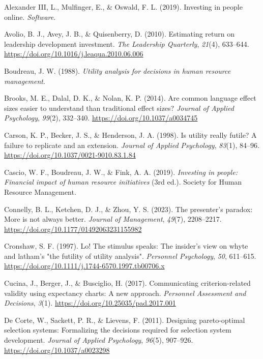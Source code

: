 \documentclass[
  english,
  man]{apa6}
\newlength{\cslhangindent}
\newenvironment{CSLReferences}[2] %
 {\begin{list}{}{%
  \setlength{\itemindent}{0pt}
  \setlength{\leftmargin}{0pt}
  \setlength{\parsep}{0pt}
  \ifodd #1
   \setlength{\leftmargin}{\cslhangindent}
   \setlength{\itemindent}{-1\cslhangindent}
  \fi
  \setlength{\itemsep}{#2\baselineskip}}}
 {\end{list}}
\begin{document}
\protect{}\label{refs}
\begin{CSLReferences}{1}{0}
Alexander III, L., Mulfinger, E., \& Oswald, F. L. (2019). Investing in people online. \emph{Software}.

Avolio, B. J., Avey, J. B., \& Quisenberry, D. (2010). Estimating return on leadership development investment. \emph{The Leadership Quarterly}, \emph{21}(4), 633--644. \url{https://doi.org/10.1016/j.leaqua.2010.06.006}

Boudreau, J. W. (1988). \emph{Utility analysis for decisions in human resource management}.

Brooks, M. E., Dalal, D. K., \& Nolan, K. P. (2014). Are common language effect sizes easier to understand than traditional effect sizes? \emph{Journal of Applied Psychology}, \emph{99}(2), 332--340. \url{https://doi.org/10.1037/a0034745}

Carson, K. P., Becker, J. S., \& Henderson, J. A. (1998). Is utility really futile? A failure to replicate and an extension. \emph{Journal of Applied Psychology}, \emph{83}(1), 84--96. \url{https://doi.org/10.1037/0021-9010.83.1.84}

Cascio, W. F., Boudreau, J. W., \& Fink, A. A. (2019). \emph{Investing in people: Financial impact of human resource initiatives} (3rd ed.). Society for Human Resource Management.

Connelly, B. L., Ketchen, D. J., \& Zhou, Y. S. (2023). The presenter's paradox: More is not always better. \emph{Journal of Management}, \emph{49}(7), 2208--2217. \url{https://doi.org/10.1177/01492063231155982}

Cronshaw, S. F. (1997). Lo! The stimulus speaks: The insider's view on whyte and latham's "the futility of utility analysis". \emph{Personnel Psychology}, \emph{50}, 611--615. \url{https://doi.org/10.1111/j.1744-6570.1997.tb00706.x}

Cucina, J., Berger, J., \& Busciglio, H. (2017). Communicating criterion-related validity using expectancy charts: A new approach. \emph{Personnel Assessment and Decisions}, \emph{3}(1). \url{https://doi.org/10.25035/pad.2017.001}

De Corte, W., Sackett, P. R., \& Lievens, F. (2011). Designing pareto-optimal selection systems: Formalizing the decisions required for selection system development. \emph{Journal of Applied Psychology}, \emph{96}(5), 907--926. \url{https://doi.org/10.1037/a0023298}


\end{CSLReferences}
\end{document}
